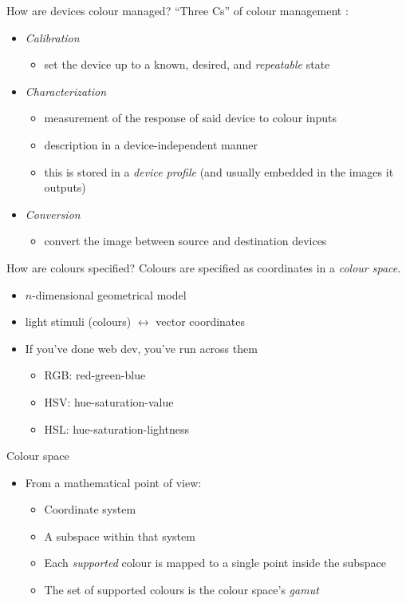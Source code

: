 \documentclass[final, aspectratio=169]{divoc}
\begin{document}
\begin{frame}{How are devices colour managed?}
  \enquote{Three Cs} of colour management \autocite{sharma}:
  \begin{itemize}[<+(1)->]
    \item \emph{Calibration}
          \begin{itemize}
            \item set the device up to a known, desired, and \emph{repeatable} state
          \end{itemize}
    \item \emph{Characterization}
          \begin{itemize}
            \item measurement of the response of said device to colour inputs
            \item description in a device-independent manner
            \item this is stored in a \emph{device profile} (and usually embedded in the images it outputs)
          \end{itemize}
    \item \emph{Conversion}
          \begin{itemize}
            \item convert the image between source and destination devices
          \end{itemize}
  \end{itemize}
\end{frame}
\begin{frame}{How are colours specified?}
  Colours are specified as coordinates in a \emph{colour space}.
  \begin{itemize}[<+(1)->]
    \item $n$-dimensional geometrical model
    \item light stimuli (colours) $\leftrightarrow$ vector coordinates
    \item If you've done web dev, you've run across them
          \begin{itemize}
            \item RGB: red-green-blue
            \item HSV: hue-saturation-value
            \item HSL: hue-saturation-lightness
          \end{itemize}
  \end{itemize}
\end{frame}
\begin{frame}{Colour space}
  \begin{itemize}
    \item From a mathematical point of view:
          \begin{itemize}
            \item Coordinate system
            \item A subspace within that system
            \item Each \emph{supported} colour is mapped to a single point inside the subspace
            \item The set of supported colours is the colour space's \emph{gamut}
          \end{itemize}
  \end{itemize}
\end{frame}
\end{document}
